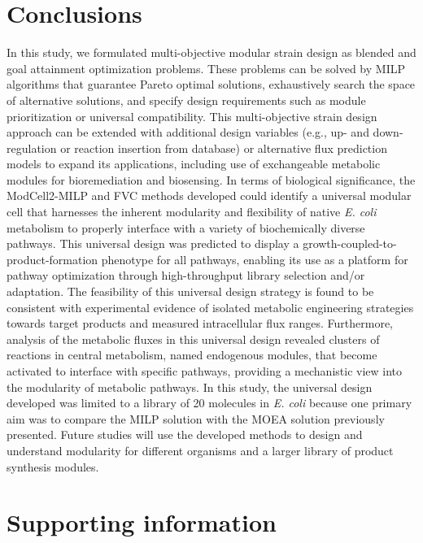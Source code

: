 \section{Conclusions}
In this study, we formulated multi-objective modular strain design as blended and goal attainment optimization problems. These problems can be solved by MILP algorithms that guarantee Pareto optimal solutions, exhaustively search the space of alternative solutions, and specify design requirements such as module prioritization or universal compatibility.
This multi-objective strain design approach can be extended with additional design variables (e.g., up- and down-regulation\citep{pharkya2004} or reaction insertion from database\citep{pharkya2006}) or alternative flux prediction models\citep{chowdhury2014,dinh2018} to expand its applications, including use of exchangeable metabolic modules for bioremediation  and biosensing.
In terms of biological significance, the ModCell2-MILP and FVC methods developed could identify a universal modular cell that harnesses the inherent modularity and flexibility of native \textit{E. coli} metabolism to properly interface with a variety of biochemically diverse pathways. This universal design was predicted to display a growth-coupled-to- product-formation phenotype for all pathways, enabling its use as a platform for pathway optimization through high-throughput library selection and/or adaptation. The feasibility of this universal design strategy is found to be consistent with experimental evidence of isolated metabolic engineering strategies towards target products and measured intracellular flux ranges. Furthermore, analysis of the metabolic fluxes in this universal design revealed clusters of reactions in central metabolism, named endogenous modules, that become activated to interface with specific pathways, providing a mechanistic view into the modularity of metabolic pathways.
In this study, the universal design developed was limited to a library of 20 molecules in \textit{E. coli} because one primary aim was to compare the MILP solution with the MOEA solution previously presented. Future studies will use the developed methods to design and understand modularity for different organisms and a larger library of product synthesis modules.


\section*{Supporting information}

